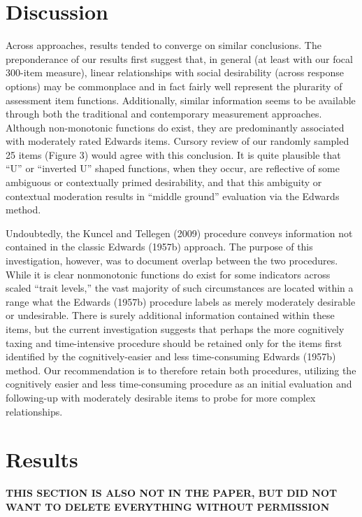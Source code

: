 \documentclass[
  ,man]{apa6}
\begin{document}
\hypertarget{discussion}{%
\section{Discussion}\label{discussion}}

Across approaches, results tended to converge on similar conclusions. The preponderance of our results first suggest that, in general (at least with our focal 300-item measure), linear relationships with social desirability (across response options) may be commonplace and in fact fairly well represent the plurarity of assessment item functions. Additionally, similar information seems to be available through both the traditional and contemporary measurement approaches. Although non-monotonic functions do exist, they are predominantly associated with moderately rated Edwards items. Cursory review of our randomly sampled 25 items (Figure 3) would agree with this conclusion. It is quite plausible that ``U'' or ``inverted U'' shaped functions, when they occur, are reflective of some ambiguous or contextually primed desirability, and that this ambiguity or contextual moderation results in ``middle ground'' evaluation via the Edwards method.

Undoubtedly, the Kuncel and Tellegen (2009) procedure conveys information not contained in the classic Edwards (1957b) approach. The purpose of this investigation, however, was to document overlap between the two procedures. While it is clear nonmonotonic functions do exist for some indicators across scaled ``trait levels,'' the vast majority of such circumstances are located within a range what the Edwards (1957b) procedure labels as merely moderately desirable or undesirable. There is surely additional information contained within these items, but the current investigation suggests that perhaps the more cognitively taxing and time-intensive procedure should be retained only for the items first identified by the cognitively-easier and less time-consuming Edwards (1957b) method. Our recommendation is to therefore retain both procedures, utilizing the cognitively easier and less time-consuming procedure as an initial evaluation and following-up with moderately desirable items to probe for more complex relationships.

\hypertarget{results-1}{%
\section{Results}\label{results-1}}

\textbf{THIS SECTION IS ALSO NOT IN THE PAPER, BUT DID NOT WANT TO DELETE EVERYTHING WITHOUT PERMISSION}
\end{document}
